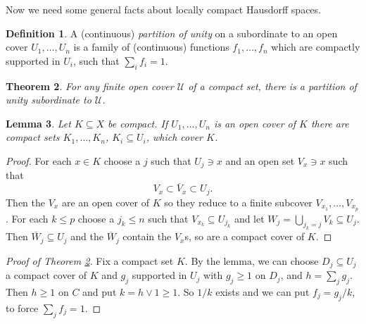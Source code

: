 \documentclass[12pt]{report}
\newcommand{\dfn}[1]{\emph{#1}\index{#1}}
\newtheorem{theorem}{Theorem}[chapter]
\newtheorem{lemma}[theorem]{Lemma}
\theoremstyle{definition}
\newtheorem{definition}[theorem]{Definition}
\begin{document}
Now we need some general facts about locally compact Hausdorff spaces.
\begin{definition}
    A (continuous) \dfn{partition of unity} on a subordinate to an open cover $U_1, \dots, U_n$ is a family of (continuous) functions $f_1, \dots, f_n$ which are compactly supported in $U_i$, such that $\sum_i f_i = 1$.
\end{definition}
\begin{theorem}
    \label{partitions of unity}
    For any finite open cover $\mathcal U$ of a compact set, there is a partition of unity subordinate to $\mathcal U$.
\end{theorem}
\begin{lemma}
    Let $K \subseteq X$ be compact. If $U_1, \dots, U_n$ is an open cover of $K$ there are compact sets $K_1, \dots, K_n$, $K_i \subseteq U_i$, which cover $K$.
\end{lemma}
\begin{proof}
    For each $x \in K$ choose a $j$ such that $U_j \ni x$ and an open set $V_x \ni x$ such that
    $$V_x \subset \overline V_x \subset U_j.$$
    Then the $V_x$ are an open cover of $K$ so they reduce to a finite subcover $V_{x_1}, \dots, V_{x_p}$. For each $k \leq p$ choose a $j_k \leq n$ such that $V_{x_k} \subseteq U_{j_k}$ and let $W_j = \bigcup_{j_k=j} V_k \subseteq U_j$. Then $\overline W_j \subseteq U_j$ and the $\overline W_j$ contain the $V_x$s, so are a compact cover of $K$.
\end{proof}
\begin{proof}[Proof of Theorem \ref{partitions of unity}]
    Fix a compact set $K$. By the lemma, we can choose $D_j \subseteq U_j$ a compact cover of $K$ and $g_j$ supported in $U_j$ with $g_j \geq 1$ on $D_j$, and $h = \sum_j g_j$. Then $h \geq 1$ on $C$ and put $k = h \vee 1 \geq 1$. So $1/k$ exists and we can put $f_j = g_j/k$, to force $\sum_j f_j = 1$.
\end{proof}
\end{document}
